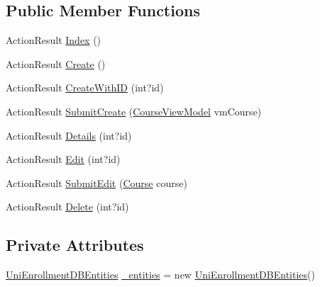 \subsection*{Public Member Functions}
\begin{DoxyCompactItemize}
\item 
Action\+Result \hyperlink{class_uni_enrollment___m_v_c_1_1_controllers_1_1_course_controller_aa5e87de4b61069e9e8a0c043dba39b16}{Index} ()
\item 
Action\+Result \hyperlink{class_uni_enrollment___m_v_c_1_1_controllers_1_1_course_controller_a94fc9ba28bf6cd5db521baa83f255609}{Create} ()
\item 
Action\+Result \hyperlink{class_uni_enrollment___m_v_c_1_1_controllers_1_1_course_controller_a28c4bc5a9d4857c2d0e2b0fdb86e924f}{Create\+With\+ID} (int?id)
\item 
Action\+Result \hyperlink{class_uni_enrollment___m_v_c_1_1_controllers_1_1_course_controller_a475949106d06d3a424f2f6b5302eee4d}{Submit\+Create} (\hyperlink{class_uni_enrollment___m_v_c_1_1_models_1_1_course_view_model}{Course\+View\+Model} vm\+Course)
\item 
Action\+Result \hyperlink{class_uni_enrollment___m_v_c_1_1_controllers_1_1_course_controller_ac5a80df6e72b44416b08f4709aa419be}{Details} (int?id)
\item 
Action\+Result \hyperlink{class_uni_enrollment___m_v_c_1_1_controllers_1_1_course_controller_afbd3818476231bac5a4b6f62a332b761}{Edit} (int?id)
\item 
Action\+Result \hyperlink{class_uni_enrollment___m_v_c_1_1_controllers_1_1_course_controller_a5ca4c1b9b6f045ff39829382838e3f4f}{Submit\+Edit} (\hyperlink{class_uni_enrollment___m_v_c_1_1_models_1_1_course}{Course} course)
\item 
Action\+Result \hyperlink{class_uni_enrollment___m_v_c_1_1_controllers_1_1_course_controller_aa918186ab2eca76077356857755580a7}{Delete} (int?id)
\end{DoxyCompactItemize}
\subsection*{Private Attributes}
\begin{DoxyCompactItemize}
\item 
\hyperlink{class_uni_enrollment___m_v_c_1_1_models_1_1_uni_enrollment_d_b_entities}{Uni\+Enrollment\+D\+B\+Entities} \hyperlink{class_uni_enrollment___m_v_c_1_1_controllers_1_1_course_controller_a4e242bdfa42da214528bfe2737274c9f}{\+\_\+entities} = new \hyperlink{class_uni_enrollment___m_v_c_1_1_models_1_1_uni_enrollment_d_b_entities}{Uni\+Enrollment\+D\+B\+Entities}()
\end{DoxyCompactItemize}



